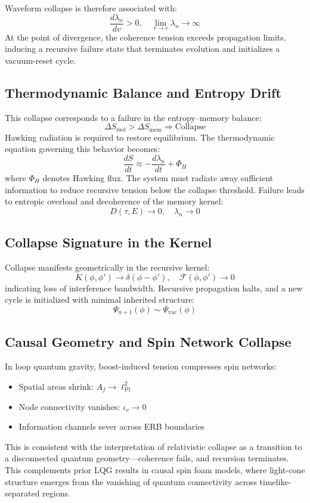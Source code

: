 Waveform collapse is therefore associated with:
\[
\frac{d\lambda_n}{dv} > 0, \quad \lim_{v \to c} \lambda_n \to \infty
\]
At the point of divergence, the coherence tension exceeds propagation limits, inducing a recursive failure state that terminates evolution and initializes a vacuum-reset cycle.

\subsection*{Thermodynamic Balance and Entropy Drift}

This collapse corresponds to a failure in the entropy–memory balance:
\[
\Delta S_{\text{fwd}} > \Delta S_{\text{mem}} \Rightarrow \text{Collapse}
\]
Hawking radiation is required to restore equilibrium. The thermodynamic equation governing this behavior becomes:
\[
\frac{dS}{dt} \approx -\frac{d\lambda_n}{dt} + \Phi_H
\]
where \( \Phi_H \) denotes Hawking flux. The system must radiate away sufficient information to reduce recursive tension below the collapse threshold. Failure leads to entropic overload and decoherence of the memory kernel:
\[
D(\tau, E) \to 0, \quad \lambda_n \to 0
\]

\subsection*{Collapse Signature in the Kernel}

Collapse manifests geometrically in the recursive kernel:
\[
K(\phi, \phi') \to \delta(\phi - \phi'), \quad \mathcal{F}(\phi, \phi') \to 0
\]
indicating loss of interference bandwidth. Recursive propagation halts, and a new cycle is initialized with minimal inherited structure:
\[
\Psi_{n+1}(\phi) \sim \Psi_{\text{vac}}(\phi)
\]

\subsection*{Causal Geometry and Spin Network Collapse}

In loop quantum gravity, boost-induced tension compresses spin networks:
\begin{itemize}
  \item Spatial areas shrink: \( A_f \to \ell_{\text{Pl}}^2 \)
  \item Node connectivity vanishes: \( \iota_v \to 0 \)
  \item Information channels sever across ERB boundaries
\end{itemize}
This is consistent with the interpretation of relativistic collapse as a transition to a disconnected quantum geometry—coherence fails, and recursion terminates. This complements prior LQG results in causal spin foam models, where light-cone structure emerges from the vanishing of quantum connectivity across timelike-separated regions.

